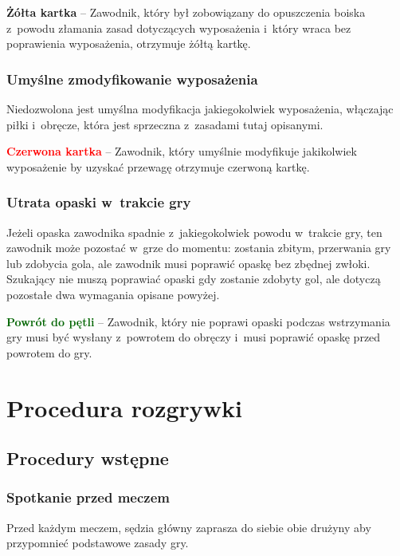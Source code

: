 \documentclass[12pt,a4paper]{article}
\newcommand\redcard[1]{\bgroup\textcolor{red}{\textbf{#1}}}
\newcommand\yellowcard[1]{\bgroup\textcolor{darkyellow}{\textbf{#1}}}
\newcommand\other[1]{\bgroup\textcolor{darkgreen}{\textbf{#1}}}
\begin{document}
\yellowcard{Żółta kartka} -- Zawodnik, który był zobowiązany do opuszczenia
boiska z~powodu złamania zasad dotyczących wyposażenia i~który wraca bez
poprawienia wyposażenia, otrzymuje żółtą kartkę.

\subsubsection{Umyślne zmodyfikowanie wyposażenia}
Niedozwolona jest
umyślna modyfikacja jakiegokolwiek wyposażenia, włączając piłki i~obręcze, która jest sprzeczna z~zasadami tutaj opisanymi.

\redcard{Czerwona kartka} -- Zawodnik, który umyślnie modyfikuje
jakikolwiek wyposażenie by uzyskać przewagę otrzymuje czerwoną kartkę.

\subsubsection{Utrata opaski w~trakcie gry}
Jeżeli opaska zawodnika
spadnie z~jakiegokolwiek powodu w~trakcie gry, ten zawodnik może
pozostać w~grze do momentu: zostania zbitym, przerwania gry lub zdobycia
gola, ale zawodnik musi poprawić opaskę bez zbędnej zwłoki. Szukający
nie muszą poprawiać opaski gdy zostanie zdobyty gol, ale dotyczą
pozostałe dwa wymagania opisane powyżej.

\other{Powrót do pętli} -- Zawodnik, który nie poprawi opaski podczas
wstrzymania gry musi być wysłany z~powrotem do obręczy i~musi poprawić
opaskę przed powrotem do gry.

\pagebreak
\section{Procedura rozgrywki}

\subsection{Procedury wstępne}

\subsubsection{Spotkanie przed meczem}
Przed każdym meczem, sędzia
główny zaprasza do siebie obie drużyny aby przypomnieć podstawowe zasady
gry.
\end{document}
